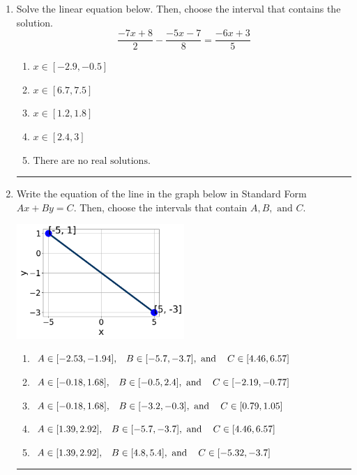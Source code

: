 \documentclass[14pt]{extbook}
\newcommand{\litem}[1]{\item#1\hspace*{-1cm}\rule{\textwidth}{0.4pt}}
\begin{document}
\begin{enumerate}
{\begin{enumerate}[label=\Alph*.]
\end{enumerate} }
\litem{
Solve the linear equation below. Then, choose the interval that contains the solution.\[ \frac{-7x + 8}{2} - \frac{-5x -7}{8} = \frac{-6x + 3}{5} \]\begin{enumerate}[label=\Alph*.]
\item \( x \in [-2.9, -0.5] \)
\item \( x \in [6.7, 7.5] \)
\item \( x \in [1.2, 1.8] \)
\item \( x \in [2.4, 3] \)
\item \( \text{There are no real solutions.} \)

\end{enumerate} }
\litem{
Write the equation of the line in the graph below in Standard Form $Ax+By=C$. Then, choose the intervals that contain $A, B, \text{ and } C$.
\begin{center}
    \includegraphics[width=0.5\textwidth]{../Figures/linearGraphToStandardCopyB.png}
\end{center}
\begin{enumerate}[label=\Alph*.]
\item \( A \in [-2.53, -1.94], \hspace{3mm} B \in [-5.7, -3.7], \text{ and } \hspace{3mm} C \in [4.46, 6.57] \)
\item \( A \in [-0.18, 1.68], \hspace{3mm} B \in [-0.5, 2.4], \text{ and } \hspace{3mm} C \in [-2.19, -0.77] \)
\item \( A \in [-0.18, 1.68], \hspace{3mm} B \in [-3.2, -0.3], \text{ and } \hspace{3mm} C \in [0.79, 1.05] \)
\item \( A \in [1.39, 2.92], \hspace{3mm} B \in [-5.7, -3.7], \text{ and } \hspace{3mm} C \in [4.46, 6.57] \)
\item \( A \in [1.39, 2.92], \hspace{3mm} B \in [4.8, 5.4], \text{ and } \hspace{3mm} C \in [-5.32, -3.7] \)


\end{enumerate}}
\end{enumerate}
\end{document}

